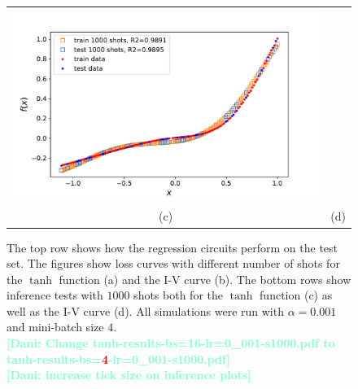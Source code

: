 \documentclass[12pt, a4paper,  nobibnotes]{article}
\newcommand{\red}[1]{\textcolor{red}{#1}}
\newcommand{\nd}[1]{\textcolor{Aquamarine}{\textbf{[Dani: #1]}}}
\begin{document}
\begin{figure}[H]
\begin{tabular}{cc}
      \includegraphics[width=\thisfigurewidth\textwidth]{figures/iv-bs=4-lr=0_001-s1000.pdf} \\
      (c) & (d) \\[6.5pt]
    \end{tabular}
    \caption{The top row shows how the regression circuits perform on the test set. The figures show
    loss curves with different number of shots for the $\tanh$ function (a) and the I-V curve (b).
    The bottom rows show inference tests with $1000$ shots both for the $\tanh$ function (c) as well
    as the I-V curve (d).
    All simulations were run with $\alpha=0.001$ and mini-batch size $4$.\\
    \nd{Change tanh-results-bs=16-lr=0\_001-s1000.pdf to tanh-results-bs=\red{4}-lr=0\_001-s1000.pdf}\\
    \nd{increase tick size on inference plots}
    }
    \label{fig:regression_results}
\end{figure}
\end{document}
